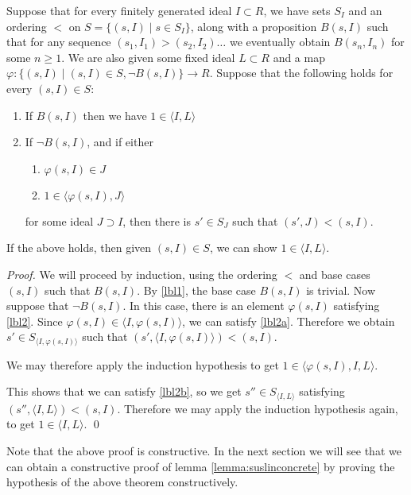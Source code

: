 \begin{theorem}\label{thm:dynamicideal}
  Suppose that for every finitely generated ideal $I \subset R$, we have sets $S_I$ and an ordering $<$ on $S = \{ (s,I) \mid s \in S_I\}$, along with a proposition $B(s,I)$ such that 
  for any sequence $(s_1, I_1) > (s_2, I_2) \dots$ we eventually obtain $B(s_n,I_n)$ for some $n\geq 1$.
  We are also given some fixed ideal $L \subset R$ and a map $\varphi : \{ (s,I) \mid (s,I) \in S, \neg B(s,I) \} \rightarrow R$.
  Suppose that the following holds for every $(s,I) \in S$:
  \begin{enumerate}
    \item\label{lbl1}
    If $B(s,I)$ then we have $1 \in \langle I, L \rangle$
    \item\label{lbl2} If $\neg B(s,I)$, and if either
      \begin{enumerate}
        \item\label{lbl2a}
          $\varphi(s,I) \in J$
        \item\label{lbl2b}
          $1 \in \langle \varphi(s,I), J \rangle$
      \end{enumerate}
      for some ideal $J \supset I$, then there is $s' \in S_J$ such that $(s',J) < (s,I)$.
  \end{enumerate}

  If the above holds, then given $(s,I) \in S$, we can show $1 \in \langle I, L \rangle$.
\end{theorem}
\begin{proof}
   We will proceed by induction, using the ordering $<$ and base cases $(s,I)$ such that $B(s,I)$.
   By \ref{lbl1}, the base case $B(s,I)$ is trivial.
   Now suppose that $\neg B(s,I)$.
   In this case, there is an element $\varphi(s,I)$ satisfying \ref{lbl2}.
   Since $\varphi(s,I) \in \langle I, \varphi(s,I) \rangle$, we can satisfy \ref{lbl2a}.
   Therefore we obtain 
   $s' \in S_{\langle I, \varphi(s,I) \rangle}$ such that $(s',\langle I, \varphi(s,I) \rangle) < (s, I)$.

   We may therefore apply the induction hypothesis to get
   $1 \in \langle \varphi(s,I), I, L \rangle$.

   This shows that we can satisfy \ref{lbl2b}, so we get $s'' \in S_{\langle I , L \rangle}$ satisfying
   $(s'',\langle I, L \rangle) < (s,I)$.
   Therefore we may apply the induction hypothesis again, to get $ 1 \in \langle I, L \rangle $.
   \qed
\end{proof}

Note that the above proof is constructive.
In the next section we will see that we can obtain a constructive proof of lemma \ref{lemma:suslinconcrete} by proving the hypothesis of the above theorem constructively.

